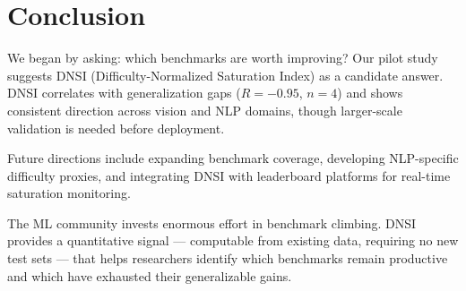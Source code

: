 \section{Conclusion}
\label{sec:conclusion}

We began by asking: which benchmarks are worth improving? Our pilot study suggests DNSI (Difficulty-Normalized Saturation Index) as a candidate answer. DNSI correlates with generalization gaps ($R = -0.95$, $n=4$) and shows consistent direction across vision and NLP domains, though larger-scale validation is needed before deployment.

Future directions include expanding benchmark coverage, developing NLP-specific difficulty proxies, and integrating DNSI with leaderboard platforms for real-time saturation monitoring.

The ML community invests enormous effort in benchmark climbing. DNSI provides a quantitative signal --- computable from existing data, requiring no new test sets --- that helps researchers identify which benchmarks remain productive and which have exhausted their generalizable gains.
